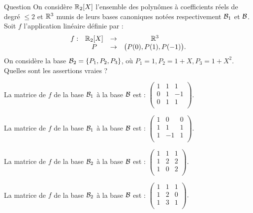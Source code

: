 \begin{multi}[multiple,feedback=
{La matrice de \(f\)  d'une base \( {\cal {B}}=(u_j)\) dans une  base \( {\cal {B}}'=(v_i)\) est la matrice  dont la \(j\)ième colonne est constituée des coordonnées de  \(f(u_j)\) dans la base \( {\cal {B}}'\). La matrice de \(f\) de la base \( {\cal {B}}_1\) à la base  \({\cal {B}}\)  est : \(
\left(\begin{array}{rcc}
1&0&0\\
1&1&1\\ 
1&-1&1\\
\end{array}\right).\)
\vskip0mm
La matrice de \(f\) de la base \( {\cal {B}}_2\) à la base  \({\cal {B}}\)  est : \(
\left(\begin{array}{rcc}
1&1&1\\
1&2&2\\ 
1&0&2\\
\end{array}\right).\)
}]{Question}
On considère \(\mathbb{R}_2[X]\) l'ensemble des polynômes à coefficients réels de degré \(\le 2\) et  \(\mathbb{R}^3\) munis de leurs bases canoniques notées respectivement \({\cal {B}}_1\) et \({\cal {B}}\). Soit \(f\) l'application linéaire définie par  : 
\[\begin{array}{rccc}f:&\mathbb{R}_2[X] &\to& \mathbb{R}^3\\
& P&\to &\big(P(0),P(1),P(-1)\big).  \end{array}\]
On considère la base \({\cal {B}}_2 = \{P_1,P_2,P_3\}\), où \( P_1=1, P_2=1+X, P_3=1+X^2\). Quelles sont les assertions vraies ?

    \item La matrice de \(f\) de la base \( {\cal {B}}_1\) à la base  \({\cal {B}}\) est : \(
\left(\begin{array}{rcc}
1&1&1\\
0&1&-1\\
0&1&1\\
\end{array}\right).\)
    \item* La matrice de \(f\) de la base \( {\cal {B}}_1\) à la base  \({\cal {B}}\)  est : \(
\left(\begin{array}{rcc}
1&0&0\\
1&1&1\\
1&-1&1\\
\end{array}\right).\)
    \item* La matrice de \(f\) de la base \( {\cal {B}}_2\) à la base  \({\cal {B}}\)  est : \(
\left(\begin{array}{rcc}
1&1&1\\
1&2&2\\
1&0&2\\
\end{array}\right).\)
    \item La matrice de \(f\) de la base \( {\cal {B}}_2\) à la base  \({\cal {B}}\)  est : \(
\left(\begin{array}{rcc}
1&1&1\\
1&2&0\\
1&3&1\\
\end{array}\right).\)
\end{multi}


